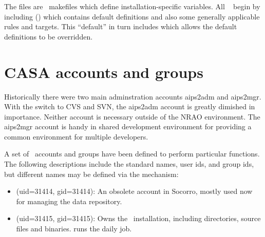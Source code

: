 The  files are \gnu\ makefiles which define
installation-specific variables.  All \casa\  begin by
including  () which
contains default definitions and also some generally applicable rules and
targets.  This ``default''  in turn includes
 which allows the default definitions to be
overridden.


\section{CASA accounts and groups}
\label{Accounts and groups}

Historically there were two main adminstration accounts aips2adm and aips2mgr.
With the switch to CVS and SVN, the aips2adm account is greatly dimished
in importance. Neither account is necessary outside of the NRAO environment.
The aips2mgr account is handy in shared development environment for providing
a common \casa environment for multiple developers.

A set of \casa\ accounts and groups have been defined to perform particular
functions.  The following descriptions include the standard names, user ids,
and group ids, but different names may be defined via the 
mechanism:

\begin{itemize}
\item
     (uid=31414, gid=31414): An obsolete account in Socorro,
    mostly used now for managing the data repository.

\item
     (uid=31415, gid=31415): Owns the \casa\ installation,
    including directories, source files and binaries.  
     runs the daily
      job.

\end{itemize}

